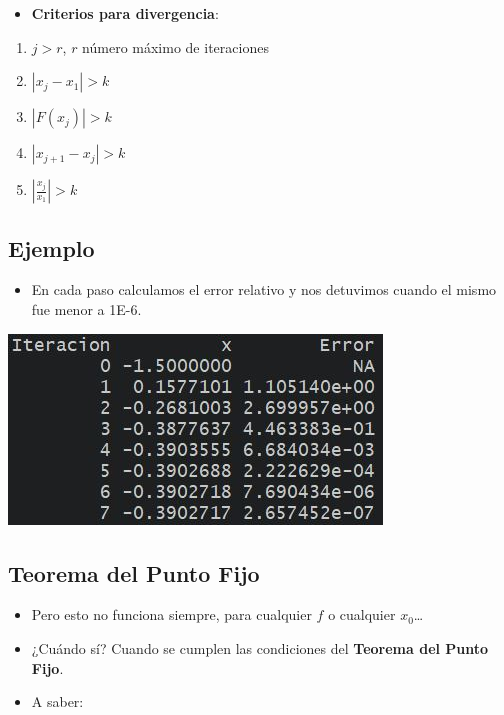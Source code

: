 \documentclass[]{book}
\providecommand{\tightlist}{%
  \setlength{\itemsep}{0pt}\setlength{\parskip}{0pt}}
\begin{document}
\begin{itemize}
\tightlist
\item
  \textbf{Criterios para divergencia}:
\end{itemize}

\begin{enumerate}
\def\labelenumi{\arabic{enumi}.}
\item
  \(j > r\), \(r\) número máximo de iteraciones
\item
  \(|x_j - x_1| > k\)
\item
  \(|F(x_j)| > k\)
\item
  \(|x_{j+1}-x_j| > k\)
\item
  \(\left|\frac{x_{j}}{x_1}\right| > k\)
\end{enumerate}

\hypertarget{ejemplo-1}{%
\subsection{Ejemplo}\label{ejemplo-1}}

\begin{itemize}
\tightlist
\item
  En cada paso calculamos el error relativo y nos detuvimos cuando el mismo fue menor a 1E-6.
\end{itemize}

\begin{center}\includegraphics[width=0.5\linewidth]{Plots/U2/rtdo} \end{center}

\hypertarget{teorema-del-punto-fijo}{%
\subsection{Teorema del Punto Fijo}\label{teorema-del-punto-fijo}}

\begin{itemize}
\tightlist
\item
  Pero esto no funciona siempre, para cualquier \(f\) o cualquier \(x_0\)\ldots{}
\item
  ¿Cuándo sí? Cuando se cumplen las condiciones del \textbf{Teorema del Punto Fijo}.
\item
  A saber:
\end{itemize}
\end{document}
